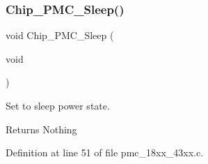 \subsubsection{\texorpdfstring{Chip\+\_\+\+P\+M\+C\+\_\+\+Sleep()}{Chip\_PMC\_Sleep()}}
{\footnotesize\ttfamily void Chip\+\_\+\+P\+M\+C\+\_\+\+Sleep (\begin{DoxyParamCaption}\item[{void}]{ }\end{DoxyParamCaption})}



Set to sleep power state. 

\begin{DoxyReturn}{Returns}
Nothing 
\end{DoxyReturn}


Definition at line 51 of file pmc\+\_\+18xx\+\_\+43xx.\+c.

